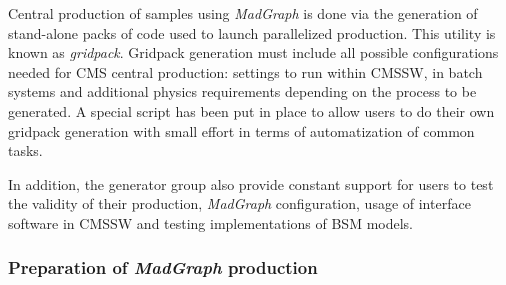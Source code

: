 Central production of samples using \textit{MadGraph} is done via the generation of stand-alone packs of code used to launch parallelized production. This utility is known as \textit{gridpack}. Gridpack generation must include all possible configurations needed for CMS central production: settings to run within CMSSW, in batch systems and additional physics requirements depending on the process to be generated. A special script has been put in place to allow users to do their own gridpack generation with small effort in terms of automatization of common tasks.

In addition, the generator group also provide constant support for users to test the validity of their production, \textit{MadGraph} configuration, usage of interface software in CMSSW and testing implementations of BSM models.

\subsubsection{Preparation of \textit{MadGraph} production}

